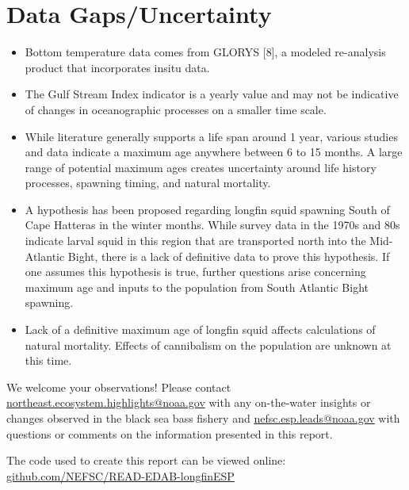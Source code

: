 \documentclass[
  9pt,
  letterpaper,
  DIV=11,
  numbers=noendperiod]{scrartcl}
\begin{document}
\normalsize\section{Data Gaps/Uncertainty}

\raggedright

\begin{itemize}
\item
  Bottom temperature data comes from GLORYS {[}8{]}, a modeled
  re-analysis product that incorporates insitu data.
\item
  The Gulf Stream Index indicator is a yearly value and may not be
  indicative of changes in oceanographic processes on a smaller time
  scale.
\item
  While literature generally supports a life span around 1 year, various
  studies and data indicate a maximum age anywhere between 6 to 15
  months. A large range of potential maximum ages creates uncertainty
  around life history processes, spawning timing, and natural mortality.
\item
  A hypothesis has been proposed regarding longfin squid spawning South
  of Cape Hatteras in the winter months. While survey data in the 1970s
  and 80s indicate larval squid in this region that are transported
  north into the Mid-Atlantic Bight, there is a lack of definitive data
  to prove this hypothesis. If one assumes this hypothesis is true,
  further questions arise concerning maximum age and inputs to the
  population from South Atlantic Bight spawning.
\item
  Lack of a definitive maximum age of longfin squid affects calculations
  of natural mortality. Effects of cannibalism on the population are
  unknown at this time.
\end{itemize}

\vspace{0.5cm}

\centering\normalsize

We welcome your observations! Please contact
\url{northeast.ecosystem.highlights@noaa.gov} with any on-the-water
insights or changes observed in the black sea bass fishery and
\url{nefsc.esp.leads@noaa.gov} with questions or comments on the
information presented in this report.\newline

The code used to create this report can be viewed online:
\href{github.com/NEFSC/READ-EDAB/longfinESP}{github.com/NEFSC/READ-EDAB-longfinESP}

\newpage
{}
\end{document}
